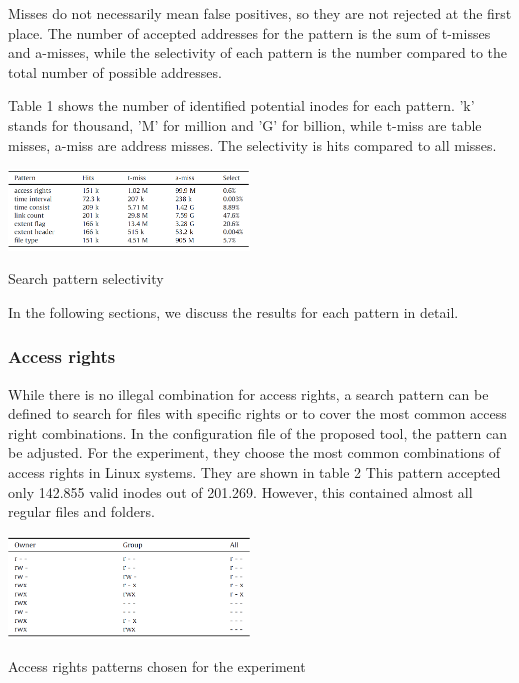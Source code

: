 \documentclass{acm_proc_article-sp}
\begin{document}
Misses do not necessarily mean false positives, so they are not rejected at the first place. The number of accepted addresses for the pattern is the sum of t-misses and a-misses, while the selectivity of each pattern is the number compared to the total number of possible addresses.

Table 1 shows the number of identified potential inodes for each pattern. 'k' stands for thousand, 'M' for million and 'G' for billion, while t-miss are table misses, a-miss are address misses. The selectivity is hits compared to all misses.

\begin{table}
\centering
\includegraphics[width=0.48\textwidth]{images/selectivity.png}
	\caption{Search pattern selectivity}
\end{table}


In the following sections, we discuss the results for each pattern in detail.

\subsubsection{Access rights}

While there is no illegal combination for access rights, a search pattern can be defined to search for files with specific rights or to cover the most common access right combinations. In the configuration file of the proposed tool, the pattern can be adjusted. For the experiment, they choose the most common combinations of access rights in Linux systems. They are shown in table 2
This pattern accepted only 142.855 valid inodes out of 201.269.  However, this contained almost all regular files and folders.

\begin{table}
\centering
\includegraphics[width=0.48\textwidth]{images/rights.png}
	\caption{Access rights patterns chosen for the experiment}
\end{table}
\end{document}
